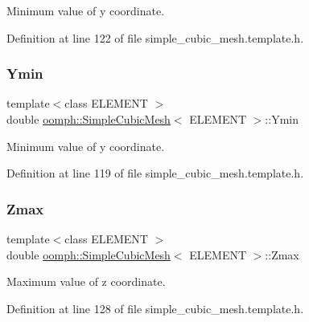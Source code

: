 Minimum value of y coordinate. 



Definition at line 122 of file simple\+\_\+cubic\+\_\+mesh.\+template.\+h.

\mbox{\label{classoomph_1_1SimpleCubicMesh_a7a004fc52edde081924073c49b0dd853}} 
\subsubsection{\texorpdfstring{Ymin}{Ymin}}
{\footnotesize\ttfamily template$<$class E\+L\+E\+M\+E\+NT $>$ \\
double \hyperlink{classoomph_1_1SimpleCubicMesh}{oomph\+::\+Simple\+Cubic\+Mesh}$<$ E\+L\+E\+M\+E\+NT $>$\+::Ymin\hspace{0.3cm}{\ttfamily [protected]}}



Minimum value of y coordinate. 



Definition at line 119 of file simple\+\_\+cubic\+\_\+mesh.\+template.\+h.

\mbox{\label{classoomph_1_1SimpleCubicMesh_aec11ab3ae84b1ba658024d833b7eafbf}} 
\subsubsection{\texorpdfstring{Zmax}{Zmax}}
{\footnotesize\ttfamily template$<$class E\+L\+E\+M\+E\+NT $>$ \\
double \hyperlink{classoomph_1_1SimpleCubicMesh}{oomph\+::\+Simple\+Cubic\+Mesh}$<$ E\+L\+E\+M\+E\+NT $>$\+::Zmax\hspace{0.3cm}{\ttfamily [protected]}}



Maximum value of z coordinate. 



Definition at line 128 of file simple\+\_\+cubic\+\_\+mesh.\+template.\+h.

\mbox{\label{classoomph_1_1SimpleCubicMesh_af01c08e1e33360eaa2102d0bebb11bcd}} 

